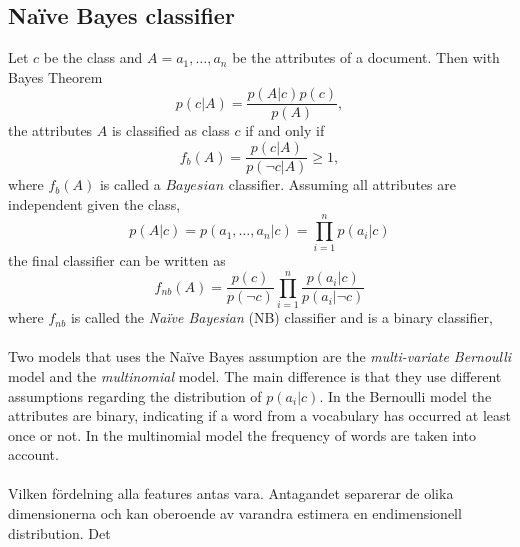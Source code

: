 \subsection{Naïve Bayes classifier}
Let $c$ be the class and $A = a_1, \dots ,a_n$ be the attributes of a document. Then with Bayes Theorem
\begin{equation}
p(c|A)=\frac{p(A|c)p(c)}{p(A)},
\end{equation}
the attributes $A$ is classified as class $c$ if and only if
\begin{equation}
f_b(A)=\frac{p(c|A)}{p(\neg c|A)} \geq 1,
\end{equation}
where $f_b(A)$ is called a $Bayesian$ classifier. Assuming all attributes are independent given the class, 
\[
p(A|c)=p(a_1,\dots ,a_n | c) = \prod_{i=1}^n p(a_i|c)
\]
the final classifier can be written as
\begin{equation}
f_{nb}(A) = \frac{p(c)}{p(\neg c)}\prod_{i=1}^n\frac{p(a_i|c)}{p(a_i|\neg c)}
\end{equation}
where $f_{nb}$ is called the \emph{Naïve Bayesian} (NB) classifier and is a binary classifier,  \\\\
Two models that uses the Naïve Bayes assumption are the \emph{multi-variate Bernoulli} model and the \emph{multinomial} model. The main difference is that they use different assumptions regarding the distribution of $p(a_i|c)$. In the Bernoulli model the attributes are binary, indicating if a word from a vocabulary has occurred at least once or not. In the multinomial model the frequency of words are taken into account.\\\\
Vilken fördelning alla features antas vara. Antagandet separerar de olika dimensionerna och kan oberoende av varandra estimera en endimensionell distribution. Det 